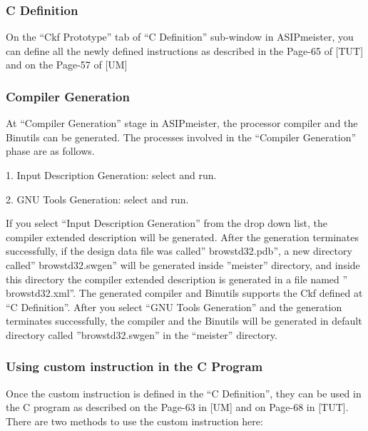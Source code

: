 \documentclass[
]{article}
\begin{document}
\hypertarget{c-definition}{%
\subsubsection{C Definition}\label{c-definition}}

On the ``Ckf Prototype'' tab of ``C Definition'' sub-window in
ASIPmeister, you can define all the newly defined instructions as
described in the Page-65 of {[}TUT{]} and on the Page-57 of {[}UM{]}

\hypertarget{compiler-generation}{%
\subsubsection{Compiler Generation}\label{compiler-generation}}

At ``Compiler Generation'' stage in ASIPmeister, the processor compiler
and the Binutils can be generated. The processes involved in the
``Compiler Generation'' phase are as follows.

1. Input Description Generation: select and run.

2. GNU Tools Generation: select and run.

If you select ``Input Description Generation'' from the drop down list,
the compiler extended description will be generated. After the
generation terminates successfully, if the design data file was called''
browstd32.pdb'', a new directory called'' browstd32.swgen'' will be
generated inside ''meister'' directory, and inside this directory the
compiler extended description is generated in a file named ''
browstd32.xml''. The generated compiler and Binutils supports the Ckf
defined at ``C Definition''. After you select ``GNU Tools Generation''
and the generation terminates successfully, the compiler and the
Binutils will be generated in default directory called
''browstd32.swgen'' in the ``meister'' directory.

\hypertarget{using-custom-instruction-in-the-c-program}{%
\subsubsection{Using custom instruction in the C
Program}\label{using-custom-instruction-in-the-c-program}}

Once the custom instruction is defined in the ``C Definition'', they can
be used in the C program as described on the Page-63 in {[}UM{]} and on
Page-68 in {[}TUT{]}. There are two methods to use the custom
instruction here:
\end{document}
